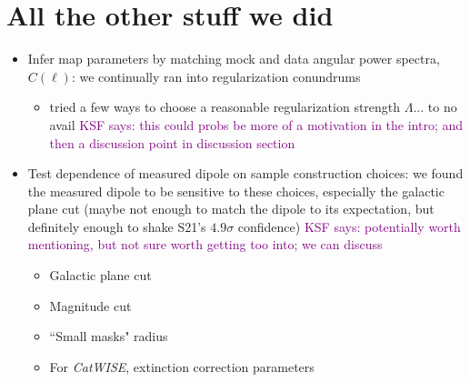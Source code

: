 \documentclass[modern]{aastex631}
\newcommand{\ksf}[1]{\textcolor{purple}{KSF says: #1}}
\newcommand{\catwise}{\textsl{CatWISE}\xspace}
\begin{document}
\section{All the other stuff we did}
\label{sec:additional_tests}
\begin{itemize}
    \item Infer map parameters by matching mock and data angular power spectra, $C(\ell)$: we continually ran into regularization conundrums
    \begin{itemize}
        \item tried a few ways to choose a reasonable regularization strength $\Lambda$... to no avail \ksf{this could probs be more of a motivation in the intro; and then a discussion point in discussion section}
    \end{itemize}
    \item Test dependence of measured dipole on sample construction choices: we found the measured dipole to be sensitive to these choices, especially the galactic plane cut (maybe not enough to match the dipole to its expectation, but definitely enough to shake S21's $4.9\sigma$ confidence) \ksf{potentially worth mentioning, but not sure worth getting too into; we can discuss}
    \begin{itemize}
        \item Galactic plane cut
        \item Magnitude cut
        \item ``Small masks" radius
        \item For \catwise, extinction correction parameters
    \end{itemize}
\end{itemize}



\end{document}
